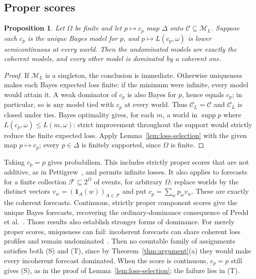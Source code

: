 \documentclass[11pt]{article}
\newtheorem{proposition}[theorem]{Proposition}
\theoremstyle{definition}
\theoremstyle{remark}
\newcommand{\M}{\mathcal M}
\newcommand{\C}{\mathcal C}
\newcommand{\supp}{\operatorname{supp}}
\begin{document}
\subsection{Proper scores}
\begin{proposition}\label{prop:short-proper}
Let $\Omega$ be finite and let $p\mapsto c_p$ map $\Delta$ onto $\C\subseteq\M_L$. Suppose each $c_p$ is the unique Bayes model for $p$, and $p\mapsto L(c_p,\omega)$ is lower semicontinuous at every world. Then the undominated models are exactly the coherent models, and every other model is dominated by a coherent one.
\end{proposition}
\begin{proof}
If $\M_L$ is a singleton, the conclusion is immediate. Otherwise uniqueness makes each Bayes expected loss finite: if the minimum were infinite, every model would attain it. {\color{red}A weak dominator of $c_p$ is also Bayes for $p$, hence equals $c_p$; in particular, so is any model tied with $c_p$ at every world. Thus $\C_L=\C$ and $\C_L$ is closed under ties. Bayes optimality gives, for each $m$, a world in $\supp p$ where $L(c_p,\omega)\le L(m,\omega)$: strict improvement throughout the support would strictly reduce the finite expected loss. Apply Lemma~\ref{lem:loss-selection} with the given map $p\mapsto c_p$; every $p\in\Delta$ is finitely supported, since $\Omega$ is finite.}
\end{proof}
Taking $c_p=p$ gives probabilism. This includes strictly proper scores that are not additive, as in Pettigrew~\cite{Pettigrew2022}, and permits infinite losses. It also applies to forecasts for a finite collection $\mathcal F\subseteq2^\Omega$ of events, for arbitrary $\Omega$: replace worlds by the distinct vectors $v_w=(\mathbf1_A(w))_{A\in\mathcal F}$ and put $c_p=\sum_wp_wv_w$. These are exactly the coherent forecasts. Continuous, strictly proper component scores give the unique Bayes forecasts, recovering the ordinary-dominance consequence of Predd et al.~\cite{Predd2009}. Those results also establish stronger forms of dominance. For merely proper scores, uniqueness can fail: incoherent forecasts can share coherent loss profiles and remain undominated~\cite{SSK2009}. {\color{red}Then no countable family of assignments satisfies both {\color{red}(S)} and {\color{red}(T)}, since by Theorem~\ref{thm:argument}(a) they would make every incoherent forecast dominated. When the score is continuous, $c_p=p$ still gives {\color{red}(S)}, as in the proof of Lemma~\ref{lem:loss-selection}; {\color{red}the failure lies in (T).}}
\end{document}
